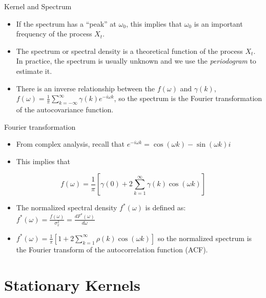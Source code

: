 \documentclass[
  ignorenonframetext,
]{beamer}
\providecommand{\tightlist}{%
  \setlength{\itemsep}{0pt}\setlength{\parskip}{0pt}}
\begin{document}
\begin{frame}{}
\protect\hypertarget{section-3}{}
\begin{block}{Kernel and Spectrum}
\protect\hypertarget{kernel-and-spectrum}{}
\begin{itemize}
\tightlist
\item
  If the spectrum has a ``peak'' at \(\omega_0\), this implies that
  \(\omega_0\) is an important frequency of the process \(X_t\).
\item
  The spectrum or spectral density is a theoretical function of the
  process \(X_t\). In practice, the spectrum is usually unknown and we
  use the \emph{periodogram} to estimate it.
\item
  There is an inverse relationship between the \(f(\omega)\) and
  \(\gamma(k)\),
  \(f(\omega) = {\frac 1 \pi} \sum_{k=−\infty}^{\infty} \gamma(k) e^{-i\omega k}\),
  so the spectrum is the Fourier transformation of the autocovariance
  function.
\end{itemize}
\end{block}
\end{frame}

\begin{frame}{}
\protect\hypertarget{section-4}{}
\begin{block}{Fourier transformation}
\protect\hypertarget{fourier-transformation-1}{}
\begin{itemize}
\tightlist
\item
  From complex analysis, recall that
  \(e^{−i\omega k} = \cos(\omega k) − \sin(\omega k)i\)
\item
  This implies that
\end{itemize}

\[
f(\omega) = {\frac 1 \pi} [\gamma(0) + 2\sum^\infty_{k=1}\gamma(k)\cos(\omega k)]
\]

\begin{itemize}
\tightlist
\item
  The normalized spectral density \(f^*(\omega)\) is defined as:
  \(f^*(\omega) = \frac {f(\omega)} {\sigma^2_x} = \frac {dF^*(\omega)} {d\omega}\)
\item
  \(f^*(\omega) = {\frac 1 \pi} [1 + 2 \sum_{k=1}^\infty \rho(k)\cos(\omega k)]\)
  so the normalized spectrum is the Fourier transform of the
  autocorrelation function (ACF).
\end{itemize}
\end{block}
\end{frame}

\hypertarget{stationary-kernels}{%
\section{Stationary Kernels}\label{stationary-kernels}}
\end{document}

